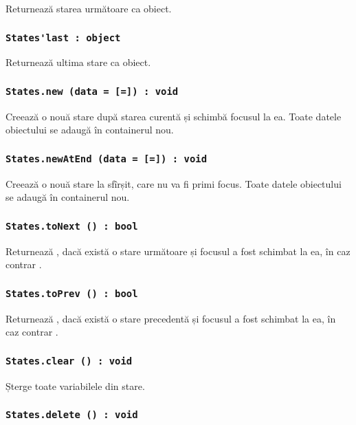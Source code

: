 Returnează starea următoare ca obiect.

\subsubsection{\lstinline|States'last : object|}

Returnează ultima stare ca obiect.

\subsubsection{\lstinline|States.new (data = [=]) : void|}

Creează o nouă stare după starea curentă și schimbă focusul la ea. Toate datele obiectului  se adaugă în containerul nou.

\subsubsection{\lstinline|States.newAtEnd (data = [=]) : void|}

Creează o nouă stare la sfîrșit, care nu va fi primi focus.  Toate datele obiectului  se adaugă în containerul nou.

\subsubsection{\lstinline|States.toNext () : bool|}

Returnează \true, dacă există o stare următoare și focusul a fost schimbat la ea, în caz contrar \false.

\subsubsection{\lstinline|States.toPrev () : bool|}

Returnează \true, dacă există o stare precedentă și focusul a fost schimbat la ea, în caz contrar \false.

\subsubsection{\lstinline|States.clear () : void|}

Șterge toate variabilele din stare.

\subsubsection{\lstinline|States.delete () : void|}

